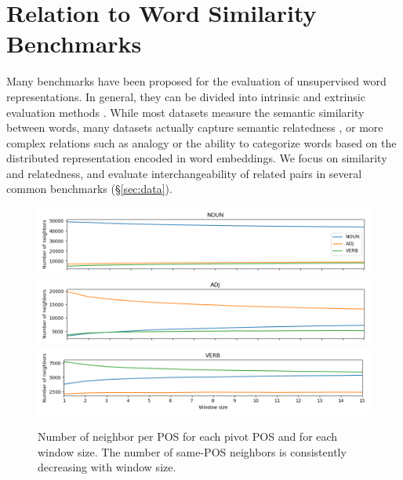 \documentclass[11pt,a4paper]{article}
\begin{document}
    
    
    \section{Relation to Word Similarity Benchmarks}\label{sec:benchmarks}
    
    Many benchmarks have been proposed for the evaluation of unsupervised word
    representations.
    In general, they can be divided into intrinsic and extrinsic evaluation methods
    \cite{schnabel2015evaluation,chiu2016intrinsic,jastrzebski2017evaluate,alshargi2018concept2vec,bakarov2018survey}.
    While most datasets measure the semantic similarity between words,
    many datasets actually capture semantic relatedness
    \cite{hill2015simlex,avraham2016improving},
    or more complex relations such as analogy or the ability to categorize
    words based on the distributed representation encoded in word embeddings.
    We focus on similarity and relatedness, and evaluate interchangeability
    of related pairs in several common benchmarks (\S\ref{sec:data}).
    
    \begin{figure}[ht]
        \includegraphics[width=\textwidth]{figs/NOUN_nn_100_fasttext_enwiki-20170501-clean_cbow-300d-min500_pos.png}
        \includegraphics[width=\textwidth]{figs/ADJ_nn_100_fasttext_enwiki-20170501-clean_cbow-300d-min500_pos.png}
        \includegraphics[width=\textwidth]{figs/VERB_nn_100_fasttext_enwiki-20170501-clean_cbow-300d-min500_pos.png}
	    \caption{Number of neighbor per POS for each pivot POS and for each window size.
	    The number of same-POS neighbors is consistently decreasing with window size.
	    \label{fig:nn_pos_hist}}
	\end{figure}
    
\end{document}
